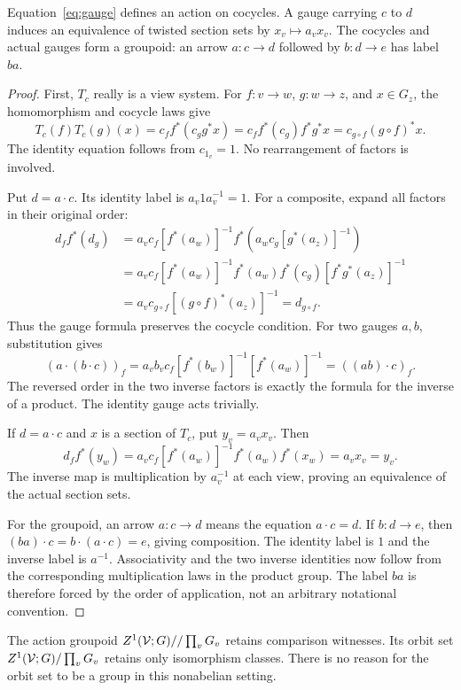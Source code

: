 \begin{proposition}\label{KS30}
Equation~\eqref{eq:gauge} defines an action on cocycles. A gauge carrying \(c\) to \(d\) induces an equivalence of twisted section sets by \(x_v\mapsto a_vx_v\). The cocycles and actual gauges form a groupoid: an arrow \(a:c\to d\) followed by \(b:d\to e\) has label \(ba\).
\end{proposition}
\begin{proof}
First, $T_c$ really is a view system. For $f:v\to w$, $g:w\to z$, and $x\in G_z$, the homomorphism and cocycle laws give
\[
 T_c(f)T_c(g)(x)=c_ff^*(c_gg^*x)
 =c_ff^*(c_g)f^*g^*x=c_{g\circ f}(g\circ f)^*x.
\]
The identity equation follows from $c_{1_v}=1$. No rearrangement of factors is involved.

Put $d=a\cdot c$. Its identity label is $a_v1a_v^{-1}=1$. For a composite, expand all factors in their original order:
\[
\begin{aligned}
 d_f f^*(d_g)
 &=a_vc_f[f^*(a_w)]^{-1}
   f^*(a_wc_g[g^*(a_z)]^{-1})\\
 &=a_vc_f[f^*(a_w)]^{-1}f^*(a_w)f^*(c_g)
       [f^*g^*(a_z)]^{-1}\\
 &=a_vc_{g\circ f}[(g\circ f)^*(a_z)]^{-1}
 =d_{g\circ f}.
\end{aligned}
\]
Thus the gauge formula preserves the cocycle condition. For two gauges $a,b$, substitution gives
\[
 (a\cdot(b\cdot c))_f
 =a_vb_vc_f[f^*(b_w)]^{-1}[f^*(a_w)]^{-1}
 =((ab)\cdot c)_f.
\]
The reversed order in the two inverse factors is exactly the formula for the inverse of a product. The identity gauge acts trivially.

If $d=a\cdot c$ and $x$ is a section of $T_c$, put $y_v=a_vx_v$. Then
\[
 d_ff^*(y_w)
 =a_vc_f[f^*(a_w)]^{-1}f^*(a_w)f^*(x_w)
 =a_vx_v=y_v.
\]
The inverse map is multiplication by $a_v^{-1}$ at each view, proving an equivalence of the actual section sets.

For the groupoid, an arrow $a:c\to d$ means the equation $a\cdot c=d$. If $b:d\to e$, then $(ba)\cdot c=b\cdot(a\cdot c)=e$, giving composition. The identity label is $1$ and the inverse label is $a^{-1}$. Associativity and the two inverse identities now follow from the corresponding multiplication laws in the product group. The label $ba$ is therefore forced by the order of application, not an arbitrary notational convention.
\end{proof}
The action groupoid \(Z^1(\mathcal V;G)//\prod_vG_v\) retains comparison witnesses. Its orbit set \(Z^1(\mathcal V;G)/\prod_vG_v\) retains only isomorphism classes. There is no reason for the orbit set to be a group in this nonabelian setting.

